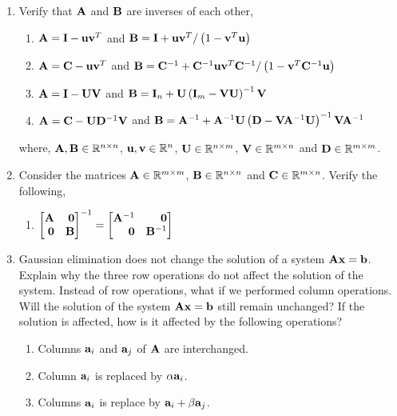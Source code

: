 \begin{enumerate}[resume]
    \item Verify that $\mathbf{A}$ and $\mathbf{B}$ are inverses of each other,
    \begin{enumerate}
        \item $\mathbf{A} = \mathbf{I} - \mathbf{u}\mathbf{v}^T$ and $\mathbf{B} = \mathbf{I} + \mathbf{u}\mathbf{v}^T / \left( 1 - \mathbf{v}^T\mathbf{u} \right)$
        \item $\mathbf{A} = \mathbf{C} - \mathbf{u}\mathbf{v}^T$ and $\mathbf{B} = \mathbf{C}^{-1} + \mathbf{C}^{-1}\mathbf{u}\mathbf{v}^T\mathbf{C}^{-1} / \left( 1 - \mathbf{v}^T\mathbf{C}^{-1}\mathbf{u} \right)$
        \item $\mathbf{A} = \mathbf{I} - \mathbf{U}\mathbf{V}$ and $\mathbf{B} = \mathbf{I}_{n} + \mathbf{U}\left( \mathbf{I}_m - \mathbf{V}\mathbf{U}\right)^{-1}\mathbf{V}$
        \item $\mathbf{A} = \mathbf{C} - \mathbf{U}\mathbf{D}^{-1}\mathbf{V}$ and $\mathbf{B} = \mathbf{A}^{-1} + \mathbf{A}^{-1}\mathbf{U}\left( \mathbf{D} - \mathbf{V}\mathbf{A}^{-1}\mathbf{U}\right)^{-1}\mathbf{V}\mathbf{A}^{-1}$
    \end{enumerate}
    where, $\mathbf{A}, \mathbf{B} \in \mathbb{R}^{n \times n}$, $\mathbf{u}, \mathbf{v} \in \mathbb{R}^n$, $\mathbf{U} \in \mathbb{R}^{n \times m}$, $\mathbf{V} \in \mathbb{R}^{m \times n}$ and $\mathbf{D} \in \mathbb{R}^{m \times m}$.

    \item Consider the matrices $\mathbf{A} \in \mathbb{R}^{m \times m}$, $\mathbf{B} \in \mathbb{R}^{n \times n}$ and $\mathbf{C} \in \mathbb{R}^{m \times n}$. Verify the following,
    \begin{enumerate}
        \item $\bmx \mf{A} & \mf{0} \\ \mf{0} & \mf{B}\emx^{-1} = \bmx \mf{A}^{-1} & \mf{0} \\ \mf{0} & \mf{B}^{-1}\emx$
    \end{enumerate}
    
    \item Gaussian elimination does not change the solution of a system $\mathbf{A}\mathbf{x} = \mathbf{b}$. Explain why the three row operations do not affect the solution of the system. Instead of row operations, what if we performed column operations. Will the solution of the system $\mathbf{Ax} = \mathbf{b}$ still remain unchanged? If the solution is affected, how is it affected by the following operations?
    \begin{enumerate}
        \item Columns $\mathbf{a}_i$ and $\mathbf{a}_j$ of $\mathbf{A}$ are interchanged.
        \item Column $\mathbf{a}_i$ is replaced by $\alpha\mathbf{a}_i$.
        \item Columns $\mathbf{a}_i$ is replace by $\mathbf{a}_i + \beta\mathbf{a}_j$.
    \end{enumerate}


\end{enumerate}
